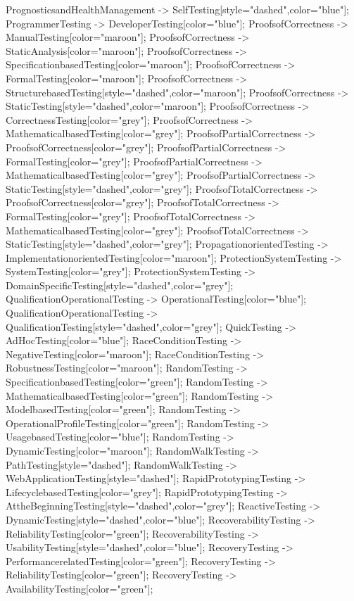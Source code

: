 \documentclass{article}
\begin{document}
{PrognosticsandHealthManagement -> SelfTesting[style="dashed",color="blue"];
ProgrammerTesting -> DeveloperTesting[color="blue"];
ProofsofCorrectness -> ManualTesting[color="maroon"];
ProofsofCorrectness -> StaticAnalysis[color="maroon"];
ProofsofCorrectness -> SpecificationbasedTesting[color="maroon"];
ProofsofCorrectness -> FormalTesting[color="maroon"];
ProofsofCorrectness -> StructurebasedTesting[style="dashed",color="maroon"];
ProofsofCorrectness -> StaticTesting[style="dashed",color="maroon"];
ProofsofCorrectness -> CorrectnessTesting[color="grey"];
ProofsofCorrectness -> MathematicalbasedTesting[color="grey"];
ProofsofPartialCorrectness -> ProofsofCorrectness[color="grey"];
ProofsofPartialCorrectness -> FormalTesting[color="grey"];
ProofsofPartialCorrectness -> MathematicalbasedTesting[color="grey"];
ProofsofPartialCorrectness -> StaticTesting[style="dashed",color="grey"];
ProofsofTotalCorrectness -> ProofsofCorrectness[color="grey"];
ProofsofTotalCorrectness -> FormalTesting[color="grey"];
ProofsofTotalCorrectness -> MathematicalbasedTesting[color="grey"];
ProofsofTotalCorrectness -> StaticTesting[style="dashed",color="grey"];
PropagationorientedTesting -> ImplementationorientedTesting[color="maroon"];
ProtectionSystemTesting -> SystemTesting[color="grey"];
ProtectionSystemTesting -> DomainSpecificTesting[style="dashed",color="grey"];
QualificationOperationalTesting -> OperationalTesting[color="blue"];
QualificationOperationalTesting -> QualificationTesting[style="dashed",color="grey"];
QuickTesting -> AdHocTesting[color="blue"];
RaceConditionTesting -> NegativeTesting[color="maroon"];
RaceConditionTesting -> RobustnessTesting[color="maroon"];
RandomTesting -> SpecificationbasedTesting[color="green"];
RandomTesting -> MathematicalbasedTesting[color="green"];
RandomTesting -> ModelbasedTesting[color="green"];
RandomTesting -> OperationalProfileTesting[color="green"];
RandomTesting -> UsagebasedTesting[color="blue"];
RandomTesting -> DynamicTesting[color="maroon"];
RandomWalkTesting -> PathTesting[style="dashed"];
RandomWalkTesting -> WebApplicationTesting[style="dashed"];
RapidPrototypingTesting -> LifecyclebasedTesting[color="grey"];
RapidPrototypingTesting -> AttheBeginningTesting[style="dashed",color="grey"];
ReactiveTesting -> DynamicTesting[style="dashed",color="blue"];
RecoverabilityTesting -> ReliabilityTesting[color="green"];
RecoverabilityTesting -> UsabilityTesting[style="dashed",color="blue"];
RecoveryTesting -> PerformancerelatedTesting[color="green"];
RecoveryTesting -> ReliabilityTesting[color="green"];
RecoveryTesting -> AvailabilityTesting[color="green"];
}
\end{document}
